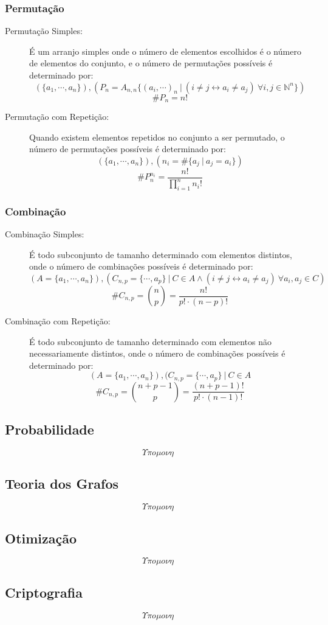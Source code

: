     \subsubsection{Permutação}
        \begin{description}
            \item[Permutação Simples:]
                É um arranjo simples onde o número de elementos escolhidos é o número de elementos do conjunto, e o número de permutações possíveis é determinado por:
                \[ (\{ a_1, \cdots, a_n \}), (P_n = A_{n,n} \{ (a_i, \cdots)_n \ | \ (i \neq j \leftrightarrow a_i \neq a_j) \ \forall i,j \in \mathbb{N}^n \}) \]
                \[ \#P_n = n! \]
            \item[Permutação com Repetição:]
                Quando existem elementos repetidos no conjunto a ser permutado, o número de permutações possíveis é determinado por:
                \[ (\{ a_1, \cdots, a_n \}), (n_i = \#\{ a_j \ | \ a_j = a_i \}) \]
                \[ \#P_{n}^{n_i} = \frac{n!}{\displaystyle\prod_{i=1}^{n} {n_i !}} \]
        \end{description}
    \subsubsection{Combinação}
        \begin{description}
            \item[Combinação Simples:]
            É todo subconjunto de tamanho determinado com elementos distintos, onde o número de combinações possíveis é determinado por:
            \[ (A = \{ a_1, \cdots, a_n \}), (C_{n, p} = \{ \cdots ,a_p\} \ | \ C \in A \wedge (i \neq j \leftrightarrow a_i \neq a_j) \ \forall a_i, a_j \in C) \]
            \[ \#C_{n, p} = \binom{n}{p} = \frac{n!}{p! \cdot (n-p)!} \]
            \item[Combinação com Repetição:]
            É todo subconjunto de tamanho determinado com elementos não necessariamente distintos, onde o número de combinações possíveis é determinado por:
            \[ (A = \{ a_1, \cdots, a_n \}), (C_{n, p} = \{ \cdots ,a_p\} \ | \ C \in A \]
            \[ \#C_{n, p} = \binom{n + p -1}{p} = \frac{(n + p - 1)!}{p! \cdot (n - 1)!} \]
        \end{description}
\subsection{Probabilidade}
    \[ \Upsilon \pi o \mu o \nu \eta \]
\subsection{Teoria dos Grafos}
    \[ \Upsilon \pi o \mu o \nu \eta \]
\subsection{Otimização}
    \[ \Upsilon \pi o \mu o \nu \eta \]
\subsection{Criptografia}
    \[ \Upsilon \pi o \mu o \nu \eta \]
